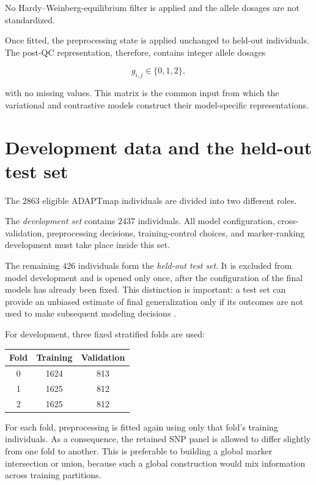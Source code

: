 No Hardy--Weinberg-equilibrium filter is applied and the allele
dosages are not standardized.

Once fitted, the preprocessing state is applied unchanged to held-out
individuals. The post-QC representation, therefore, contains integer
allele dosages

\begin{equation}
    g_{i,j}\in\{0,1,2\},
    \label{eq:allele_dosage}
\end{equation}

with no missing values. This matrix is the common input from which the
variational and contrastive models construct their model-specific
representations.

\section{Development data and the held-out test set}
\label{sec:data_partitioning}

The $2863$ eligible ADAPTmap individuals are divided into two
different roles.

The \emph{development set} contains $2437$ individuals. All model
configuration, cross-validation, preprocessing decisions,
training-control choices, and marker-ranking development must take
place inside this set.

The remaining $426$ individuals form the \emph{held-out test set}. It is
excluded from model development and is opened only once, after the
configuration of the final models has already been fixed. This
distinction is important: a test set can provide an unbiased estimate
of final generalization only if its outcomes are not used to make
subsequent modeling decisions \cite{ambroise2002selection}.

For development, three fixed stratified folds are used:

\begin{center}
\begin{tabular}{c|cc}
\hline
Fold & Training & Validation \\
\hline
0 & 1624 & 813 \\
1 & 1625 & 812 \\
2 & 1625 & 812 \\
\hline
\end{tabular}
\end{center}

For each fold, preprocessing is fitted again using only that fold's
training individuals. As a consequence, the retained SNP panel is
allowed to differ slightly from one fold to another. This is
preferable to building a global marker intersection or union, because
such a global construction would mix information across training
partitions.

